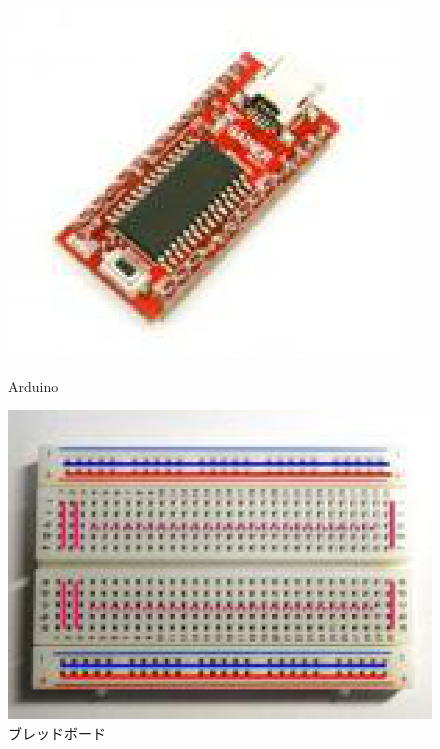 \documentclass[11pt,a4paper]{jarticle}
\begin{document}
\begin{figure}[h!]
 \begin{minipage}{0.5\columnwidth}
  \centering
  \includegraphics[height=0.5\columnwidth]{img/arduino.eps}
  \caption{Arduino}
 \end{minipage}
 \begin{minipage}{0.5\columnwidth}
  \centering
  \includegraphics[height=0.5\columnwidth]{img/breadboard.eps}
  \caption{ブレッドボード}
 \end{minipage}
\end{figure}
\end{document}
